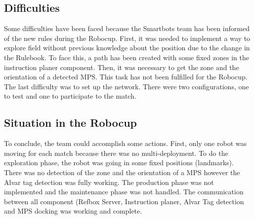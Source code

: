 \subsection{Difficulties}

Some difficulties have been faced because the Smartbots team has been informed of the new rules during the Robocup. First, it was needed to implement a way to explore field without previous knowledge about the position due to the change in the Rulebook. To face this, a path has been created with some fixed zones in the instruction planer component.  Then, it was necessary to get the zone and the orientation of a detected MPS. This task has not been fulfilled for the Robocup. The last difficulty was to set up the network. There were two configurations, one to test and one to participate to the match.
 

\subsection{Situation in the Robocup}

To conclude, the team could accomplish some actions. First, only one robot was moving for each match because there was no multi-deployment. To do the exploration phase, the robot was going in some fixed positions (landmarks). There was no detection of the zone and the orientation of a MPS however the Alvar tag detection was fully working. The production phase was not implemented and the maintenance phase was not handled. The communication between all component (Refbox Server, Instruction planer, Alvar Tag detection and MPS docking was working and complete. 